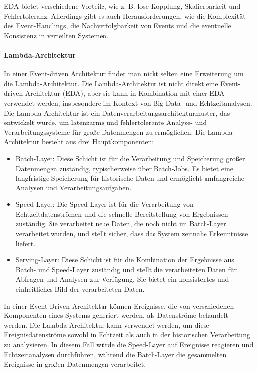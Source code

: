 \documentclass[../vs-script-first-v01.tex]{subfiles}
\begin{document}
EDA bietet verschiedene Vorteile, wie z. B. lose Kopplung, Skalierbarkeit und Fehlertoleranz. Allerdings gibt es auch Herausforderungen, wie die Komplexität des Event-Handlings, die Nachverfolgbarkeit von Events und die eventuelle Konsistenz in verteilten Systemen.

\paragraph{Lambda-Architektur}
In einer Event-driven Architektur findet man nicht selten eine Erweiterung um die Lambda-Architektur.
Die Lambda-Architektur ist nicht direkt eine Event-driven Architektur (EDA), aber sie kann in Kombination mit einer EDA verwendet werden, insbesondere im Kontext von Big-Data- und Echtzeitanalysen. Die Lambda-Architektur ist ein Datenverarbeitungsarchitekturmuster, das entwickelt wurde, um latenzarme und fehlertolerante Analyse- und Verarbeitungssysteme für große Datenmengen zu ermöglichen. Die Lambda-Architektur besteht aus drei Hauptkomponenten:
\begin{itemize}
\item Batch-Layer: Diese Schicht ist für die Verarbeitung und Speicherung großer Datenmengen zuständig, typischerweise über Batch-Jobs. Es bietet eine langfristige Speicherung für historische Daten und ermöglicht umfangreiche Analysen und Verarbeitungsaufgaben.

\item Speed-Layer: Die Speed-Layer ist für die Verarbeitung von Echtzeitdatenströmen und die schnelle Bereitstellung von Ergebnissen zuständig. Sie verarbeitet neue Daten, die noch nicht im Batch-Layer verarbeitet wurden, und stellt sicher, dass das System zeitnahe Erkenntnisse liefert.

\item Serving-Layer: Diese Schicht ist für die Kombination der Ergebnisse aus Batch- und Speed-Layer zuständig und stellt die verarbeiteten Daten für Abfragen und Analysen zur Verfügung. Sie bietet ein konsistentes und einheitliches Bild der verarbeiteten Daten.
\end{itemize}
In einer Event-Driven Architektur können Ereignisse, die von verschiedenen Komponenten eines Systems generiert werden, als Datenströme behandelt werden. Die Lambda-Architektur kann verwendet werden, um diese Ereignisdatenströme sowohl in Echtzeit als auch in der historischen Verarbeitung zu analysieren. In diesem Fall würde die Speed-Layer auf Ereignisse reagieren und Echtzeitanalysen durchführen, während die Batch-Layer die gesammelten Ereignisse in großen Datenmengen verarbeitet.
\end{document}
